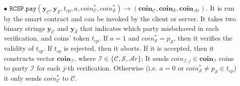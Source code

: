 \begin{definition}[RC-S-P Scheme]
\begin{itemize}
\item[$\bullet$] $\mathtt{RCSP}.\mathtt{pay}(\bm{y}_{\scriptscriptstyle \mathcal C},\bm{y}_{\scriptscriptstyle \mathcal S},t_{\scriptscriptstyle cp},a,coin^{\scriptscriptstyle *}_{\scriptscriptstyle\mathcal C},coin^{\scriptscriptstyle *}_{\scriptscriptstyle\mathcal S})\rightarrow ({\bm{coin}}_{\scriptscriptstyle\mathcal C},{\bm{coin}}_{\scriptscriptstyle\mathcal S},{\bm{coin}}_{\scriptscriptstyle\mathcal Ar})$. It is run by the smart contract and can be invoked by the client or server. It takes  two binary strings $\bm{y}_{\scriptscriptstyle \mathcal C}$ and $\bm{y}_{\scriptscriptstyle \mathcal S}$ that indicates which party misbehaved in each verification, and coins' token $t_{\scriptscriptstyle cp}$. If $a=1$ and  $coin^{\scriptscriptstyle *}_{\scriptscriptstyle\mathcal S}= p_{\scriptscriptstyle\mathcal S}$, then it verifies the validity of $t_{\scriptscriptstyle cp}$. If $t_{\scriptscriptstyle cp}$ is rejected, then it aborts. 
If it is accepted, then it constructs  vector ${\bm{coin}}_{\scriptscriptstyle\mathcal I}$, where $\mathcal{I}\in\{\mathcal{C},\mathcal{S},\mathcal{A}r\}$; It sends ${{coin}}_{\scriptscriptstyle\mathcal{I},j}\in{\bm{coin}}_{\scriptscriptstyle\mathcal I}$ coins to party $\mathcal{I}$ for each $j$-th verification. Otherwise (i.e. $a=0$ or $coin^{\scriptscriptstyle *}_{\scriptscriptstyle\mathcal S}\neq p_{\scriptscriptstyle\mathcal S}\in t_{\scriptscriptstyle cp}$)  it only sends $coin^{\scriptscriptstyle *}_{\scriptscriptstyle\mathcal C}$ to $\mathcal C$. 



\end{itemize}
\end{definition}

